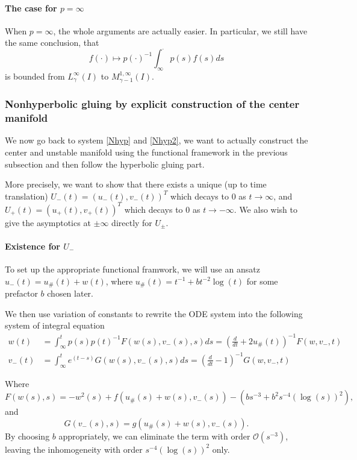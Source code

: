 \documentclass[letterpaper,11pt]{article}
\newcommand{\rmO}{\mathcal{O}}
\numberwithin{equation}{section}
\theoremstyle{plain}
\begin{document}
\paragraph{The case for $p=\infty$}

When $p=\infty$, the whole arguments are actually easier. In particular, we still have the same conclusion, that
\[
f(\cdot) \mapsto p(\cdot)^{-1}\int_\infty^{\cdot} p(s)f(s)ds
\]
is bounded from $L^\infty_\gamma(I)$ to $M^{1,\infty}_{\gamma-1}(I)$.

\subsubsection{Nonhyperbolic gluing by explicit construction of the center manifold}
We now go back to system \eqref{Nhyp} and \eqref{Nhyp2}, we want to actually construct the center and unstable manifold using the functional framework in the previous subsection and then follow the hyperbolic gluing part.

More precisely, we want to show that there exists a unique (up to time translation) $U_-(t) = (u_-(t),v_-(t))^T$ which decays to $0$ as $t \to \infty$, and $U_+(t) = (u_+(t),v_+(t))^T$ which decays to $0$ as $t\to -\infty$. We also wish to give the asymptotics at $\pm \infty$ directly for $U_{\pm}$.

\paragraph{Existence for $U_-$}

To set up the appropriate functional framwork, we will use an ansatz $u_-(t) = u_\#(t) + w(t)$, where $u_\#(t) = t^{-1}+bt^{-2}\log(t)$ for some prefactor $b$ chosen later.

We then use variation of constants to rewrite the ODE system into the following system of integral equation
\begin{align*}
w(t) &= \int_\infty^t p(s)p(t)^{-1} F (w(s),v_-(s),s)ds  = \left(\frac{d}{dt}+2u_\#(t)\right)^{-1} F(w,v_-,t)\\
v_-(t) &= \int_\infty^t e^{(t-s)}G(w(s),v_-(s),s)ds = \left(\frac{d}{dt}-1\right)^{-1} G(w,v_-,t)
\end{align*}

Where 
\[
F(w(s),s) = -w^2(s)+f(u_\#(s)+w(s),v_-(s))-(b s^{-3}+b^2 s^{-4}(\log(s))^2),
\] and 
\[
G(v_-(s),s) = g(u_\#(s)+w(s),v_-(s)).
\]
By choosing $b$ appropriately, we can eliminate the term  with order $\rmO(s^{-3})$, leaving the inhomogeneity with order $s^{-4}(\log(s))^2$ only.
\end{document}
